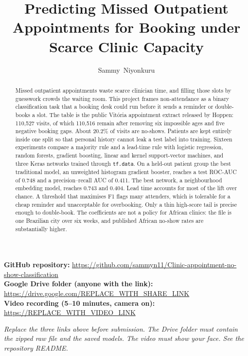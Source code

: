\documentclass[journal]{IEEEtran}
\begin{document}
\title{Predicting Missed Outpatient Appointments for Booking under Scarce Clinic Capacity}

\author{Sammy~Niyonkuru}


\maketitle

\begin{center}
\noindent
\textbf{GitHub repository:} \url{https://github.com/sammyn11/Clinic-appointment-no-show-classification}\\[0.3em]
\textbf{Google Drive folder (anyone with the link):} \url{https://drive.google.com/REPLACE_WITH_SHARE_LINK}\\[0.3em]
\textbf{Video recording (5--10 minutes, camera on):} \url{https://REPLACE_WITH_VIDEO_LINK}
\end{center}

\vspace{0.6em}
\noindent\textit{Replace the three links above before submission. The Drive folder must contain the zipped raw file and the saved models. The video must show your face. See the repository README.}

\begin{abstract}
Missed outpatient appointments waste scarce clinician time, and filling those slots by guesswork crowds the waiting room. This project frames non-attendance as a binary classification task that a booking desk could run before it sends a reminder or double-books a slot. The table is the public Vit\'oria appointment extract released by Hoppen: 110{,}527 visits, of which 110{,}516 remain after removing six impossible ages and five negative booking gaps. About 20.2\% of visits are no-shows. Patients are kept entirely inside one split so that personal history cannot leak a test label into training. Sixteen experiments compare a majority rule and a lead-time rule with logistic regression, random forests, gradient boosting, linear and kernel support-vector machines, and three Keras networks trained through \texttt{tf.data}. On a held-out patient group the best traditional model, an unweighted histogram gradient booster, reaches a test ROC-AUC of 0.748 and a precision--recall AUC of 0.411. The best network, a neighbourhood embedding model, reaches 0.743 and 0.404. Lead time accounts for most of the lift over chance. A threshold that maximises F1 flags many attenders, which is tolerable for a cheap reminder and unacceptable for overbooking. Only a thin high-score tail is precise enough to double-book. The coefficients are not a policy for African clinics: the file is one Brazilian city over six weeks, and published African no-show rates are substantially higher.
\end{abstract}
\end{document}
